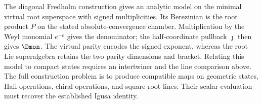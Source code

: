 The diagonal Fredholm construction gives an analytic model on the
minimal virtual root superspace with signed multiplicities. Its Berezinian
is the root product $P$ on the stated absolute-convergence chamber.
Multiplication by the Weyl monomial $e^{-\rho}$ gives the denominator;
the half-coordinate pullback $\jmath$ then gives $\Dmon$.
The virtual parity encodes the signed exponent, whereas the root Lie
superalgebra retains the two parity dimensions and bracket. Relating
this model to compact states requires an intertwiner and the line
comparison above. The full construction problem is to produce
compatible maps on geometric states, Hall operations, chiral
operations, and square-root lines. Their scalar evaluation must
recover the established Igusa identity.
